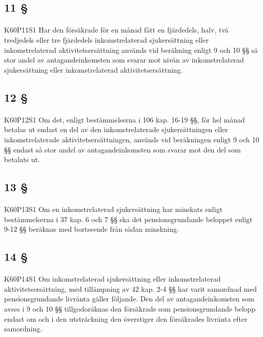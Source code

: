 \documentclass[a4paper,notitlepage,openany,10pt]{book}
\begin{document}
\subsection*{11 §}
\paragraph*{}
{\tiny K60P11S1}
Har den försäkrade för en månad fått en fjärdedels, halv, två tredjedels eller tre fjärdedels inkomstrelaterad sjukersättning eller inkomstrelaterad aktivitetsersättning används vid beräkning enligt 9 och 10 §§ så stor andel av antagandeinkomsten som svarar mot nivån av inkomstrelaterad sjukersättning eller inkomstrelaterad aktivitetsersättning.
\subsection*{12 §}
\paragraph*{}
{\tiny K60P12S1}
Om det, enligt bestämmelserna i 106 kap. 16-19 §§, för hel månad betalas ut endast en del av den inkomstrelaterade sjukersättningen eller inkomstrelaterade aktivitetsersättningen, används vid beräkningen enligt 9 och 10 §§ endast så stor andel av antagandeinkomsten som svarar mot den del som betalats ut.
\subsection*{13 §}
\paragraph*{}
{\tiny K60P13S1}
Om en inkomstrelaterad sjukersättning har minskats enligt bestämmelserna i 37 kap. 6 och 7 §§ ska det pensionsgrundande beloppet enligt 9-12 §§ beräknas med bortseende från sådan minskning.
\subsection*{14 §}
\paragraph*{}
{\tiny K60P14S1}
Om inkomstrelaterad sjukersättning eller inkomstrelaterad aktivitetsersättning, med tillämpning av 42 kap. 2-4 §§ har varit samordnad med pensionsgrundande livränta gäller följande. Den del av antagandeinkomsten som avses i 9 och 10 §§ tillgodoräknas den försäkrade som pensionsgrundande belopp endast om och i den utsträckning den överstiger den försäkrades livränta efter samordning.
\end{document}
